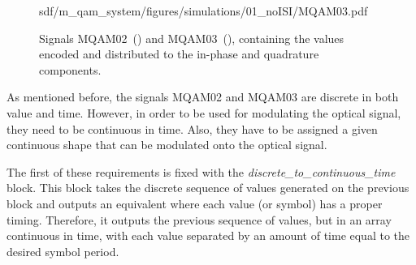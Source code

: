 \begin{figure}[H]
\begin{minipage}{0.45\textwidth}
			{sdf/m_qam_system/figures/simulations/01_noISI/MQAM03.pdf}
			\subcaption{}\label{fig:ISImqam3}
		\end{minipage}
		\caption{Signals MQAM02~() and 
		MQAM03~(), 
		containing the values encoded and distributed to the in-phase and quadrature
		components.}
	\end{figure}

As mentioned before, the signals MQAM02 and MQAM03 are discrete in both value 
and 
time. However, in order to be used for modulating the optical signal, they need 
to 
be continuous in time. Also, they have to be assigned a given continuous 
shape that can be modulated onto the optical signal.

The first of these requirements is fixed with the 
\textit{discrete\_to\_continuous\_time} block. This block takes the discrete 
sequence of values generated on the previous block and outputs an equivalent 
where each value (or symbol) has a proper timing. Therefore, it outputs the 
previous sequence of values, but in an array continuous in time, with each 
value separated by an amount of time 
equal to the desired symbol period.

